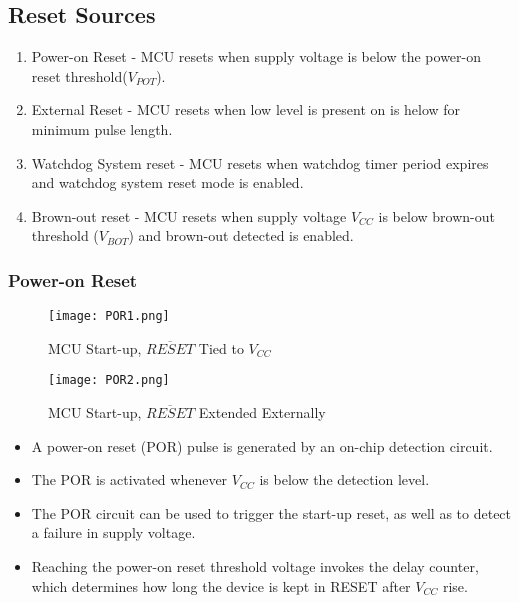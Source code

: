 \documentclass{article}
\begin{document}
\subsection{Reset Sources}
\begin{enumerate}[label=(\Roman*)]
    \item Power-on Reset - MCU resets when supply voltage is below the power-on reset threshold($V_{POT}$).
    \item External Reset - MCU resets when low level is present on  is helow for minimum pulse length.
    \item Watchdog System reset - MCU resets when watchdog timer period expires and watchdog system reset mode is enabled.
    \item Brown-out reset - MCU resets when supply voltage $V_{CC}$ is below brown-out threshold ($V_{BOT}$) and brown-out detected is enabled.
\end{enumerate}

\subsubsection{Power-on Reset}
\begin{figure}[H]
    \begin{minipage}{0.45\textwidth}
        \begin{center}
            \texttt{[image: POR1.png]}
            \caption*{MCU Start-up, $\overline{RESET}$ Tied to $V_{CC}$}
        \end{center}
    \end{minipage}
    \begin{minipage}{0.5\textwidth}
        \begin{center}
            \texttt{[image: POR2.png]}
            \caption*{MCU Start-up, $\overline{RESET}$ Extended Externally}
        \end{center}
    \end{minipage}
\end{figure}
\begin{itemize}
    \item A power-on reset (POR) pulse is generated by an on-chip detection circuit.
    \item The POR is activated whenever $V_{CC}$ is below the detection level.
    \item The POR circuit can be used to trigger the start-up reset, as well as to detect a failure in supply voltage.
    \item Reaching the power-on reset threshold voltage invokes the delay counter, which determines how long the device is kept in RESET after $V_{CC}$ rise.
\end{itemize}
\end{document}
